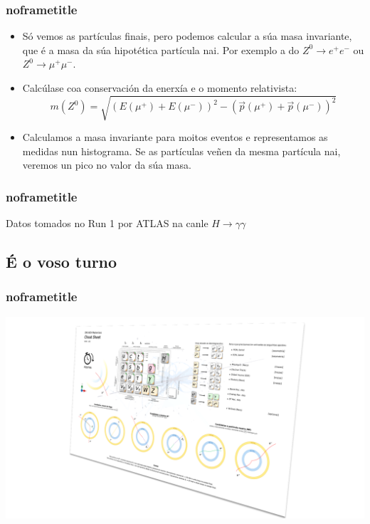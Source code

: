 \documentclass{beamer}
\begin{document}
\begin{frame}[default]
\frametitle{noframetitle}

  \begin{itemize}
    \item Só vemos as partículas finais, pero podemos calcular a súa masa
    invariante, que é a masa da súa hipotética partícula nai. Por
    exemplo a do $Z^0 \rightarrow e^+ e^-$ ou $Z^0 \rightarrow \mu^+ \mu^-$.
  
    \item Calcúlase coa conservación da enerxía e o momento relativista:
    $$ m(Z^0) = \sqrt{ (E(\mu^+)+E(\mu^-))^2 - (\vec{p}(\mu^+)+\vec{p}(\mu^-))^2 } $$
  
    \item Calculamos a masa invariante para moitos eventos e representamos as medidas nun
    histograma. Se as partículas veñen da mesma partícula nai, veremos un
    pico no valor da súa masa.
  \end{itemize}

\end{frame}



\begin{frame}[default]
\frametitle{noframetitle}

  Datos tomados no Run 1 por ATLAS na canle $H \rightarrow \gamma \gamma$
  
  \begin{center}
  \end{center}

\end{frame}



\subsection*{É o voso turno}
\begin{frame}
\frametitle{noframetitle}

\includegraphics[scale=0.4]{gpx/cheat_sheet.pdf}

\end{frame}
\end{document}
